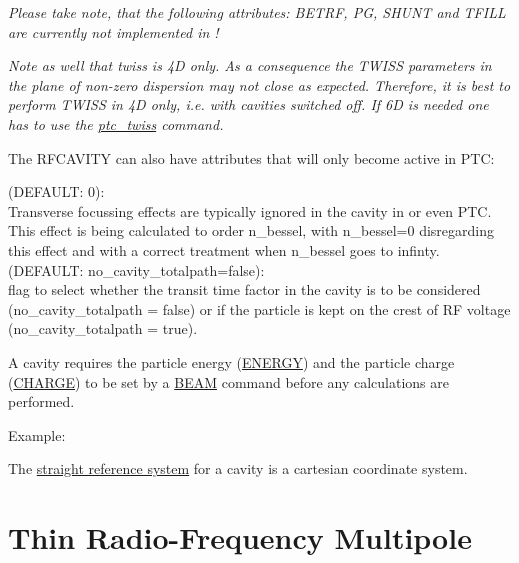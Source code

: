 \textit{ Please take note, that the following \madeight attributes:
  BETRF, PG, SHUNT and TFILL are currently not implemented in \madx!}    

\textit{ Note as well that twiss is 4D only. As a consequence
  the TWISS parameters in the plane of non-zero dispersion may not
  close as expected. Therefore, it is best to perform TWISS in 4D
  only, i.e. with cavities switched off. If 6D is needed one has to
  use the \href{../ptc_twiss/ptc_twiss.html}{ptc\_twiss} command. } 

The RFCAVITY can also have attributes that will only become active in PTC: 
\begin{madlist}
    (DEFAULT: 0): \\
     Transverse focussing effects are typically ignored in the cavity in
     \madx or even PTC. This effect is being calculated to order n\_bessel,
     with n\_bessel=0 disregarding this effect and with a correct treatment
     when n\_bessel goes to infinty.
    (DEFAULT: no\_cavity\_totalpath=false): \\
     flag to select whether the transit time factor in the cavity is to be
     considered (no\_cavity\_totalpath = false) or if the particle is
     kept on the crest of RF voltage (no\_cavity\_totalpath = true).  
\end{madlist}

A cavity requires the particle energy (\href{beam.html#energy}{ENERGY})
and the particle charge (\href{beam.html#charge}{CHARGE}) to be set by a
\href{beam.html}{BEAM} command before any calculations are performed.  

 Example: 

The \href{local_system.html#straight}{straight reference system} for a
cavity is a cartesian coordinate system.  


\section{Thin Radio-Frequency Multipole}
\label{sec:rfmultipole}

